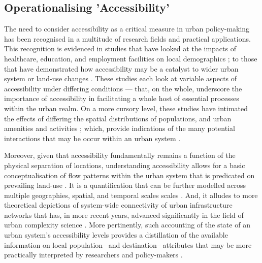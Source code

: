 \subsection{Operationalising 'Accessibility'}

The need to consider accessibility as a critical measure in urban policy-making has been recognised in a multitude of research fields and practical applications. This recognition is evidenced in studies that have looked at the impacts of healthcare, education, and employment facilities on local demographics \citep{sa2006does,cheng2013measuring, brondeel2014use}; to those that have demonstrated how accessibility may be a catalyst to wider urban system or land-use changes \citep{hansen1959accessibility, tsou2005accessibility}. These studies each look at variable aspects of accessibility under differing conditions --- that, on the whole, underscore the importance of accessibility in facilitating a whole host of essential processes within the urban realm. On a more cursory level, these studies have intimated the effects of differing the spatial distributions of populations, and urban amenities and activities \citep{tsou2005accessibility,redfearn2011network}; which, provide indications of the many potential interactions that may be occur within an urban system \citep{miller2018accessibility}. 

Moreover, given that accessibility fundamentally remains a function of the physical separation of locations, understanding accessibility allows for a basic conceptualisation of flow patterns within the urban system that is predicated on prevailing land-use \citep{hansen2009analysing}. It is a quantification that can be further modelled across multiple geographies, spatial, and temporal scales scales \citep{bhat2000development}. And, it alludes to more theoretical depictions of system-wide connectivity of urban infrastructure networks that has, in more recent years, advanced significantly in the field of urban complexity science \citep{batty2009cities}. More pertinently, such accounting of the state of an urban system's accessibility levels provides a distillation of the available information on local population-- and destination-- attributes that may be more practically interpreted by researchers and policy-makers \citep{wilson1971family}.


